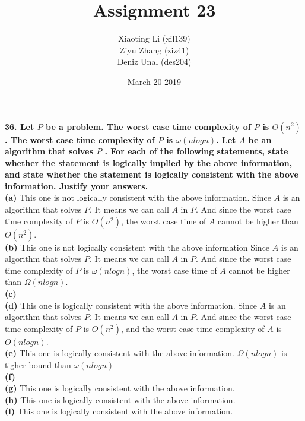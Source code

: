 \documentclass{article}
\title{Assignment 23}
\author{Xiaoting Li (xil139) \\
Ziyu Zhang (ziz41) \\
Deniz Unal (des204)}
\date{March 20 2019}
\begin{document}
\maketitle

\noindent
\textbf{36. Let $P$ be a problem. The worst case time complexity of $P$ is $O(n^2)$. The worst case time complexity of $P$ is $\omega(nlogn)$. Let $A$ be an algorithm that solves $P$ . For each of the following statements, state whether the statement is logically implied by the above information, and state whether the statement is logically consistent with the above information. Justify your answers.} \\ \newline
\textbf{(a)} This one is not logically consistent with the above information. Since $A$ is an algorithm that solves $P$. It means we can call $A$ in $P$. And since the worst case time complexity of $P$ is $O(n^2)$, the worst case time of $A$ cannot be higher than $O(n^2)$.\\ \newline
\textbf{(b)} This one is not logically consistent with the above information Since $A$ is an algorithm that solves $P$. It means we can call $A$ in $P$. And since the worst case time complexity of $P$ is $\omega(nlogn)$, the worst case time of $A$ cannot be higher than $\Omega(nlogn)$. \\ \newline
\textbf{(c)} \\ \newline
\textbf{(d)} This one is logically consistent with the above information. Since $A$ is an algorithm that solves $P$. It means we can call $A$ in $P$. And since the worst case time complexity of $P$ is $O(n^2)$, and the worst case time complexity of $A$ is $O(nlogn)$.\\ \newline
\textbf{(e)} This one is logically consistent with the above information. $\Omega(nlogn)$ is tigher bound than $\omega(nlogn)$\\ \newline
\textbf{(f)} \\ \newline
\textbf{(g)} This one is logically consistent with the above information.\\ \newline
\textbf{(h)} This one is logically consistent with the above information.\\ \newline
\textbf{(i)} This one is logically consistent with the above information.\\ \newline
\end{document}
